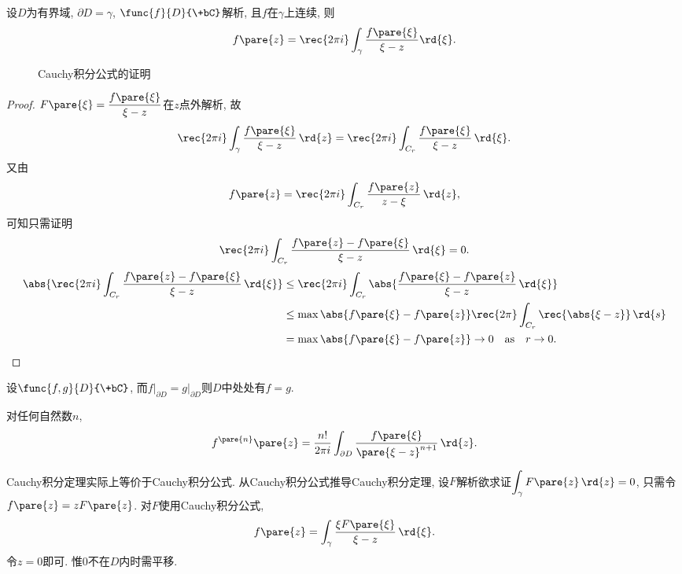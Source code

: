 \documentclass{ctexart}
\begin{document}
\begin{finale}
    \begin{theorem}[Cauchy积分公式]
        设$D$为有界域, $\partial D = \gamma$, $\func{f}{D}{\+bC}$解析, 且$f$在$\gamma$上连续, 则
        \[ f\pare{z} = \rec{2\pi i} \int_\gamma \frac{f\pare{\xi}}{\xi - z} \rd{\xi}. \]
    \end{theorem}
\end{finale}
\begin{figure}[hb]
    \centering
    \caption{Cauchy积分公式的证明}
\end{figure}
\begin{proof}
    $\displaystyle F\pare{\xi} = \frac{f\pare{\xi}}{\xi - z}$在$z$点外解析, 故
    \[ \rec{2\pi i} \int_\gamma \frac{f\pare{\xi}}{\xi - z}\,\rd{z} = \rec{2\pi i}\int_{C_r} \frac{f\pare{\xi}}{\xi - z}\,\rd{\xi}. \]
    又由
    \[ f\pare{z} = \rec{2\pi i}\int_{C_r} \frac{f\pare{z}}{z - \xi}\,\rd{z}, \]
    可知只需证明
    \[ \rec{2\pi i} \int_{C_r} \frac{f\pare{z} - f\pare{\xi}}{\xi - z} \,\rd{\xi} = 0. \]
    \begin{align*}
        \abs{\rec{2\pi i} \int_{C_r} \frac{f\pare{z} - f\pare{\xi}}{\xi - z}\,\rd{\xi}} &\le \rec{2\pi i}\int_{C_r} \abs{\frac{f\pare{\xi} - f\pare{z}}{\xi - z}\,\rd{\xi}} \\
        &\le \max\abs{f\pare{\xi} - f\pare{z}} \rec{2\pi} \int_{C_r} {\rec{\abs{\xi - z}}}\,\rd{s} \\
        &= \max \abs{f\pare{\xi} - f\pare{z}} \rightarrow 0\quad \mathrm{as} \quad r\rightarrow 0. \qedhere
    \end{align*}
\end{proof}
\begin{remark}
    设$\func{f,g}{D}{\+bC}$, 而$f\vert_{\partial D} = g\vert_{\partial D}$则$D$中处处有$f=g$.
\end{remark}
\begin{theorem}[Cauchy积分公式求导]
    对任何自然数$n$,
    \[ f^{\pare{n}}\pare{z} = \frac{n!}{2\pi i}\int_{\partial D} \frac{f\pare{\xi}}{\pare{\xi - z}^{n+1}}\,\rd{z}. \]
\end{theorem}
\begin{remark}
    Cauchy积分定理实际上等价于Cauchy积分公式. 从Cauchy积分公式推导Cauchy积分定理, 设$F$解析欲求证$\displaystyle \int_\gamma F\pare{z}\,\rd{z} = 0$, 只需令$f\pare{z} = zF\pare{z}$. 对$F$使用Cauchy积分公式,
    \[ f\pare{z} = \int_\gamma \frac{\xi F\pare{\xi}}{\xi - z}\,\rd{\xi}. \]
    令$z=0$即可. 惟$0$不在$D$内时需平移.
\end{remark}
\end{document}
